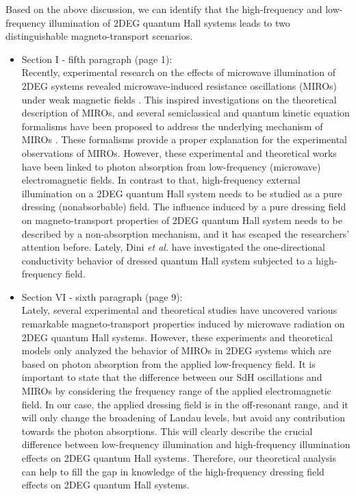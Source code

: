 \documentclass{article}
\begin{document}
Based on the above discussion, we can identify that the high-frequency and low-frequency illumination of 2DEG quantum Hall systems leads to two distinguishable
magneto-transport scenarios.

\begin{itemize}
  \item Section I - fifth paragraph (page 1):\\
  {\color{Red}
  Recently, experimental research on the effects of microwave illumination of 2DEG systems revealed microwave-induced resistance oscillations (MIROs) under weak magnetic fields \cite{zudov01,mani02,zudov03,mani04}.
  This inspired investigations on the theoretical description of MIROs, and several semiclassical and quantum kinetic equation formalisms have been proposed to address the underlying mechanism of MIROs \cite{durst03,dmitriev03,dmitriev05,dmitriev09}. These formalisms provide a proper explanation for the experimental observations of MIROs. However, these experimental and theoretical works have been linked to photon absorption from low-frequency (microwave) electromagnetic fields.
  In contrast to that, high-frequency external illumination on a 2DEG quantum Hall system needs to be studied as a pure dressing (nonabsorbable) field.
  The influence induced by a pure dressing field on
  magneto-transport properties of 2DEG quantum Hall system needs to be described by a non-absorption mechanism, and it has escaped the researchers’ attention before.
  Lately, Dini \textit{et al.} \cite{dini16} have investigated the one-directional conductivity behavior of dressed quantum Hall system subjected to a high-frequency field.
  }
  \item Section VI - sixth paragraph (page 9):\\
  {\color{Red}
  Lately, several experimental \cite{zudov01,mani02,zudov03,mani04} and theoretical \cite{durst03,dmitriev03,dmitriev05,dmitriev09} studies have uncovered various remarkable
  magneto-transport properties induced by microwave radiation on 2DEG quantum Hall systems. However, these experiments and theoretical models only analyzed the behavior of MIROs in 2DEG systems which are based on photon absorption from the applied low-frequency field.
  It is important to state that the difference between our SdH oscillations and MIROs \cite{zudov01,mani02,zudov03,mani04} by considering the frequency range of the applied electromagnetic field. In our case, the applied dressing field is in the off-resonant range, and it will only change the broadening of Landau levels, but avoid any contribution towards the photon absorptions. This will clearly describe the crucial difference between low-frequency illumination and high-frequency illumination effects on 2DEG quantum Hall systems. Therefore, our theoretical analysis can help to fill the gap in knowledge of the high-frequency dressing field effects on 2DEG quantum Hall systems.
  }
\end{itemize}
\end{document}
